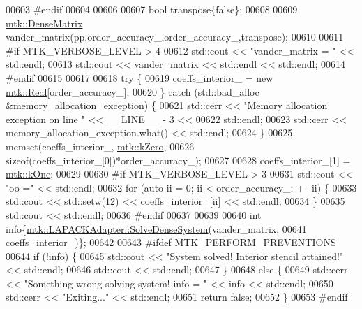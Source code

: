 \begin{DoxyCode}
{{00603 \textcolor{preprocessor}{  #endif}
00604 
00606 
00607   \textcolor{keywordtype}{bool} transpose\{\textcolor{keyword}{false}\};
00608 
00609   \hyperlink{classmtk_1_1DenseMatrix}{mtk::DenseMatrix} vander\_matrix(pp,order\_accuracy\_,order\_accuracy\_,transpose);
00610 
00611 \textcolor{preprocessor}{  #if MTK\_VERBOSE\_LEVEL > 4}
00612   std::cout << \textcolor{stringliteral}{"vander\_matrix = "} << std::endl;
00613   std::cout << vander\_matrix << std::endl << std::endl;
00614 \textcolor{preprocessor}{  #endif}
00615 
00617 
00618   \textcolor{keywordflow}{try} \{
00619     coeffs\_interior\_ = \textcolor{keyword}{new} \hyperlink{group__c01-roots_gac080bbbf5cbb5502c9f00405f894857d}{mtk::Real}[order\_accuracy\_];
00620   \} \textcolor{keywordflow}{catch} (std::bad\_alloc &memory\_allocation\_exception) \{
00621     std::cerr << \textcolor{stringliteral}{"Memory allocation exception on line "} << \_\_LINE\_\_ - 3 <<
00622       std::endl;
00623     std::cerr << memory\_allocation\_exception.what() << std::endl;
00624   \}
00625   memset(coeffs\_interior\_, \hyperlink{group__c01-roots_ga59a451a5fae30d59649bcda274fea271}{mtk::kZero},
00626 \textcolor{keyword}{sizeof}(coeffs\_interior\_[0])*order\_accuracy\_);
00627 
00628   coeffs\_interior\_[1] = \hyperlink{group__c01-roots_ga26407c24d43b6b95480943340d285c71}{mtk::kOne};
00629 
00630 \textcolor{preprocessor}{  #if MTK\_VERBOSE\_LEVEL > 3}
00631   std::cout << \textcolor{stringliteral}{"oo ="} << std::endl;
00632   \textcolor{keywordflow}{for} (\textcolor{keyword}{auto} ii = 0; ii < order\_accuracy\_; ++ii) \{
00633     std::cout << std::setw(12) << coeffs\_interior\_[ii] << std::endl;
00634   \}
00635   std::cout << std::endl;
00636 \textcolor{preprocessor}{  #endif}
00637 
00639 
00640   \textcolor{keywordtype}{int} info\{\hyperlink{classmtk_1_1LAPACKAdapter_a7428bccf74fd4a4af68fb7233846da22}{mtk::LAPACKAdapter::SolveDenseSystem}(vander\_matrix,
00641                                                 coeffs\_interior\_)\};
00642 
00643 \textcolor{preprocessor}{  #ifdef MTK\_PERFORM\_PREVENTIONS}
00644   \textcolor{keywordflow}{if} (!info) \{
00645     std::cout << \textcolor{stringliteral}{"System solved! Interior stencil attained!"} << std::endl;
00646     std::cout << std::endl;
00647   \}
00648   \textcolor{keywordflow}{else} \{
00649     std::cerr << \textcolor{stringliteral}{"Something wrong solving system! info = "} << info << std::endl;
00650     std::cerr << \textcolor{stringliteral}{"Exiting..."} << std::endl;
00651     \textcolor{keywordflow}{return} \textcolor{keyword}{false};
00652   \}
00653 \textcolor{preprocessor}{  #endif}
}}
\end{DoxyCode}
